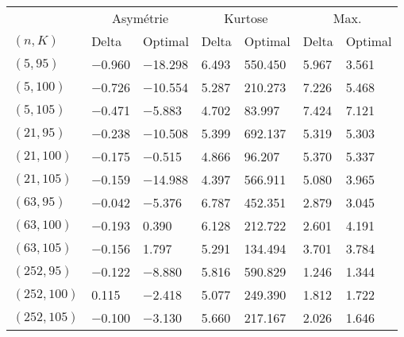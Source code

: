 \begin{tabular}{lllllll}
\toprule
& \multicolumn{2}{c}{Asymétrie} & \multicolumn{2}{c}{Kurtose} & \multicolumn{2}{c}{Max.}\\
$(n,K)$& Delta & Optimal & Delta & Optimal & Delta & Optimal\\
\midrule
$(5,95)$ & \num{-0.960} & \num{-18.298} & \num{6.493} & \num{550.450} & \num{5.967} & \num{3.561}\\
$(5,100)$ & \num{-0.726} & \num{-10.554} & \num{5.287} & \num{210.273} & \num{7.226} & \num{5.468}\\
$(5,105)$ & \num{-0.471} & \num{-5.883} & \num{4.702} & \num{83.997} & \num{7.424} & \num{7.121}\\
$(21,95)$ & \num{-0.238} & \num{-10.508} & \num{5.399} & \num{692.137} & \num{5.319} & \num{5.303}\\
$(21,100)$ & \num{-0.175} & \num{-0.515} & \num{4.866} & \num{96.207} & \num{5.370} & \num{5.337}\\
$(21,105)$ & \num{-0.159} & \num{-14.988} & \num{4.397} & \num{566.911} & \num{5.080} & \num{3.965}\\
$(63,95)$ & \num{-0.042} & \num{-5.376} & \num{6.787} & \num{452.351} & \num{2.879} & \num{3.045}\\
$(63,100)$ & \num{-0.193} & \num{0.390} & \num{6.128} & \num{212.722} & \num{2.601} & \num{4.191}\\
$(63,105)$ & \num{-0.156} & \num{1.797} & \num{5.291} & \num{134.494} & \num{3.701} & \num{3.784}\\
$(252,95)$ & \num{-0.122} & \num{-8.880} & \num{5.816} & \num{590.829} & \num{1.246} & \num{1.344}\\
$(252,100)$ & \num{0.115} & \num{-2.418} & \num{5.077} & \num{249.390} & \num{1.812} & \num{1.722}\\
$(252,105)$ & \num{-0.100} & \num{-3.130} & \num{5.660} & \num{217.167} & \num{2.026} & \num{1.646}\\
\bottomrule
\end{tabular}
\\[3em]
